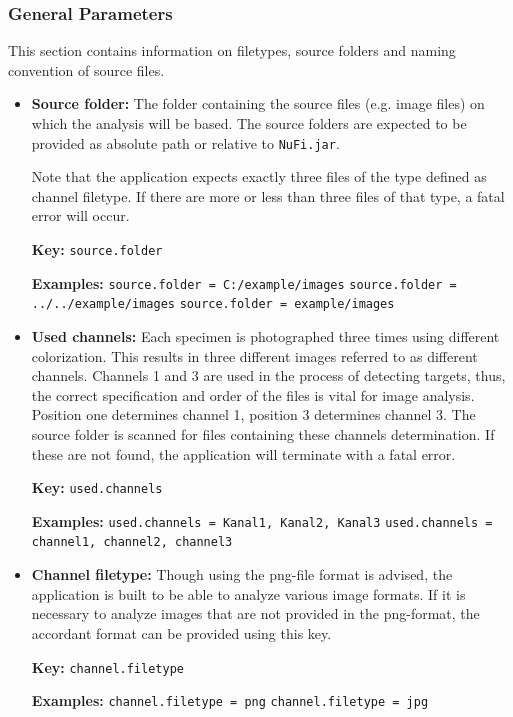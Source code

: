 \documentclass[a4paper, 12pt]{article}
\newcommand{\code}[1]{\colorbox{codegray}{\texttt{#1}}}
\begin{document}
\subsubsection{General Parameters}
This section contains information on filetypes, source folders and naming
convention of source files.
\begin{itemize}
  \item \textbf{Source folder:} The folder containing the source files (e.g.
  image files) on which the analysis will be based. The source folders are
  expected to be provided as absolute path or relative to \code{NuFi.jar}.
  
  Note that the application expects exactly three files of the type defined as
  channel filetype. If there are more or less than three files of that type, a
  fatal error will occur.
  
  \textbf{Key:}
  \newline \code{source.folder}
  
  \textbf{Examples:}
  \newline \code{source.folder = C:/example/images}
  \newline \code{source.folder = ../../example/images}
  \newline \code{source.folder = example/images}
  
  \item \textbf{Used channels:} Each specimen is photographed three times
  using different colorization. This results in three different images
  referred to as different channels. Channels 1 and 3 are used in the process
  of detecting targets, thus, the correct specification and order of the
  files is vital for image analysis. Position one determines channel 1,
  position 3 determines channel 3. The source folder is scanned for files
  containing these channels determination. If these are not found, the
  application will terminate with a fatal error.
  
  \textbf{Key:}
  \newline \code{used.channels}
  
  \textbf{Examples:}
  \newline \code{used.channels = Kanal1, Kanal2, Kanal3}
  \newline \code{used.channels = channel1, channel2, channel3}
  
  \item \textbf{Channel filetype:} Though using the png-file format is advised,
  the application is built to be able to analyze various image formats. If it
  is necessary to analyze images that are not provided in the png-format, the
  accordant format can be provided using this key.
  
  \textbf{Key:}
  \newline \code{channel.filetype}
  
  \textbf{Examples:}
  \newline \code{channel.filetype = png}
  \newline \code{channel.filetype = jpg}
\end{itemize}
\end{document}
